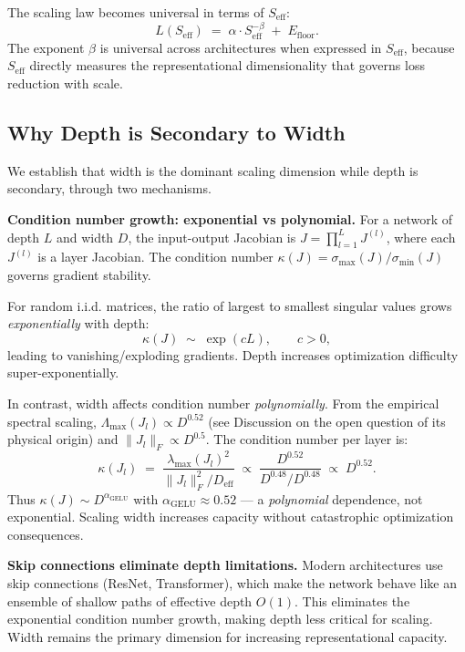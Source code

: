 \documentclass[11pt, a4paper]{article}
\theoremstyle{plain}
\begin{document}
The scaling law becomes universal in terms of $S_{\mathrm{eff}}$:
\begin{equation}
\boxed{L(S_{\mathrm{eff}}) \;=\; \alpha \cdot S_{\mathrm{eff}}^{-\beta} \;+\; E_{\mathrm{floor}}}.
\end{equation}
The exponent $\beta$ is universal across architectures when expressed in $S_{\mathrm{eff}}$, because $S_{\mathrm{eff}}$ directly measures the representational dimensionality that governs loss reduction with scale.

\subsection{Why Depth is Secondary to Width}

We establish that width is the dominant scaling dimension while depth is secondary, through two mechanisms.

\medskip\noindent\textbf{Condition number growth: exponential vs polynomial.} For a network of depth $L$ and width $D$, the input-output Jacobian is $J = \prod_{l=1}^L J^{(l)}$, where each $J^{(l)}$ is a layer Jacobian. The condition number $\kappa(J) = \sigma_{\max}(J) / \sigma_{\min}(J)$ governs gradient stability.

For random i.i.d. matrices, the ratio of largest to smallest singular values grows \emph{exponentially} with depth:
\begin{equation}
\kappa(J) \;\sim\; \exp(cL), \qquad c > 0,
\end{equation}
leading to vanishing/exploding gradients. Depth increases optimization difficulty super-exponentially.

In contrast, width affects condition number \emph{polynomially}. From the empirical spectral scaling, $\Lambda_{\max}(J_l) \propto D^{0.52}$ (see Discussion on the open question of its physical origin) and $\|J_l\|_F \propto D^{0.5}$. The condition number per layer is:
\begin{equation}
\kappa(J_l) \;=\; \frac{\lambda_{\max}(J_l)^2}{\|J_l\|_F^2 / D_{\mathrm{eff}}}
\;\propto\; \frac{D^{0.52}}{D^{0.48}/D^{0.48}} \;\propto\; D^{0.52}.
\end{equation}
Thus $\kappa(J) \sim D^{\alpha_{\mathrm{GELU}}}$ with $\alpha_{\mathrm{GELU}} \approx 0.52$ --- a \emph{polynomial} dependence, not exponential. Scaling width increases capacity without catastrophic optimization consequences.

\medskip\noindent\textbf{Skip connections eliminate depth limitations.} Modern architectures use skip connections (ResNet, Transformer), which make the network behave like an ensemble of shallow paths of effective depth $O(1)$. This eliminates the exponential condition number growth, making depth less critical for scaling. Width remains the primary dimension for increasing representational capacity.
\end{document}

